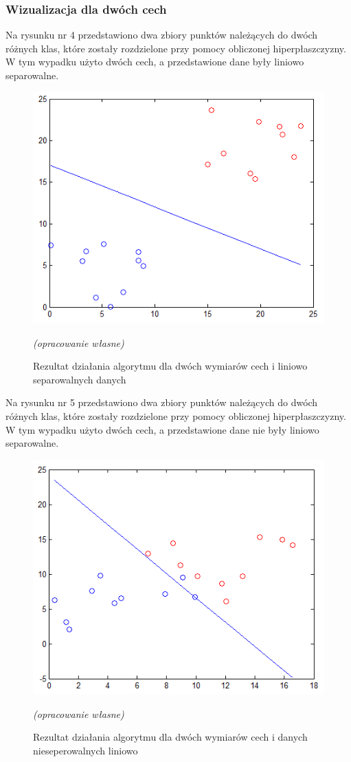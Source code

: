 \documentclass[[10pt,a4paper]{article}
\begin{document}
\subsubsection{Wizualizacja dla dwóch cech}
Na rysunku nr 4 przedstawiono dwa zbiory punktów należących do dwóch różnych klas, które zostały rozdzielone przy pomocy obliczonej hiperpłaszczyzny. W tym wypadku użyto dwóch cech, a przedstawione dane były liniowo separowalne. 
\begin{figure}[h]
\centering
\includegraphics{visualize1}\\
\caption{Rezultat działania algorytmu dla dwóch wymiarów cech i liniowo separowalnych danych }
\textit{(opracowanie własne)}
\end{figure}

\newpage
Na rysunku nr 5 przedstawiono dwa zbiory punktów należących do dwóch różnych klas, które zostały rozdzielone przy pomocy obliczonej hiperpłaszczyzny. W tym wypadku użyto dwóch cech, a przedstawione dane nie były liniowo separowalne. 
\begin{figure}[h]
\centering
\includegraphics{visualize2}\\
\caption{Rezultat działania algorytmu dla dwóch wymiarów cech i danych nieseperowalnych liniowo  }
\textit{(opracowanie własne)}
\end{figure}
\end{document}
